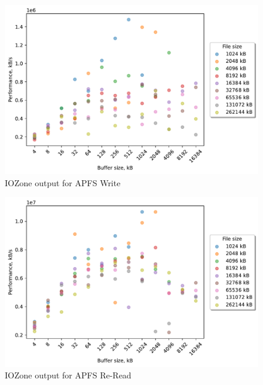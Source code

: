 \begin{figure}[!htb]
	\label{fig:bench_apfs_write}
	\begin{center}
		\includegraphics[width=1.0\textwidth]{figures.nosync/benchmarking/local/Write.pdf}
	\end{center}
	\caption{IOZone output for \gls{APFS} Write}
\end{figure}

\begin{figure}[!htb]
	\label{fig:bench_apfs_re_read}
	\begin{center}
		\includegraphics[width=1.0\textwidth]{figures.nosync/benchmarking/local/Re-Read.pdf}
	\end{center}
	\caption{IOZone output for \gls{APFS} \mbox{Re-Read}}
\end{figure}

